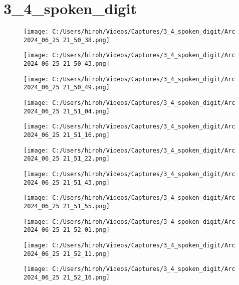 \documentclass{ltjsarticle}
\begin{document}
\section{3\_4\_spoken\_digit}
\begin{figure}[htbp]
  \centering
  \texttt{[image: C:/Users/hiroh/Videos/Captures/3\_4\_spoken\_digit/Arc 2024\_06\_25 21\_50\_38.png]}
\end{figure}
\begin{figure}[htbp]
  \centering
  \texttt{[image: C:/Users/hiroh/Videos/Captures/3\_4\_spoken\_digit/Arc 2024\_06\_25 21\_50\_43.png]}
\end{figure}
\begin{figure}[htbp]
  \centering
  \texttt{[image: C:/Users/hiroh/Videos/Captures/3\_4\_spoken\_digit/Arc 2024\_06\_25 21\_50\_49.png]}
\end{figure}
\begin{figure}[htbp]
  \centering
  \texttt{[image: C:/Users/hiroh/Videos/Captures/3\_4\_spoken\_digit/Arc 2024\_06\_25 21\_51\_04.png]}
\end{figure}
\begin{figure}[htbp]
  \centering
  \texttt{[image: C:/Users/hiroh/Videos/Captures/3\_4\_spoken\_digit/Arc 2024\_06\_25 21\_51\_16.png]}
\end{figure}
\begin{figure}[htbp]
  \centering
  \texttt{[image: C:/Users/hiroh/Videos/Captures/3\_4\_spoken\_digit/Arc 2024\_06\_25 21\_51\_22.png]}
\end{figure}
\begin{figure}[htbp]
  \centering
  \texttt{[image: C:/Users/hiroh/Videos/Captures/3\_4\_spoken\_digit/Arc 2024\_06\_25 21\_51\_43.png]}
\end{figure}
\begin{figure}[htbp]
  \centering
  \texttt{[image: C:/Users/hiroh/Videos/Captures/3\_4\_spoken\_digit/Arc 2024\_06\_25 21\_51\_55.png]}
\end{figure}
\begin{figure}[htbp]
  \centering
  \texttt{[image: C:/Users/hiroh/Videos/Captures/3\_4\_spoken\_digit/Arc 2024\_06\_25 21\_52\_01.png]}
\end{figure}
\begin{figure}[htbp]
  \centering
  \texttt{[image: C:/Users/hiroh/Videos/Captures/3\_4\_spoken\_digit/Arc 2024\_06\_25 21\_52\_11.png]}
\end{figure}
\begin{figure}[htbp]
  \centering
  \texttt{[image: C:/Users/hiroh/Videos/Captures/3\_4\_spoken\_digit/Arc 2024\_06\_25 21\_52\_16.png]}
\end{figure}
\end{document}
